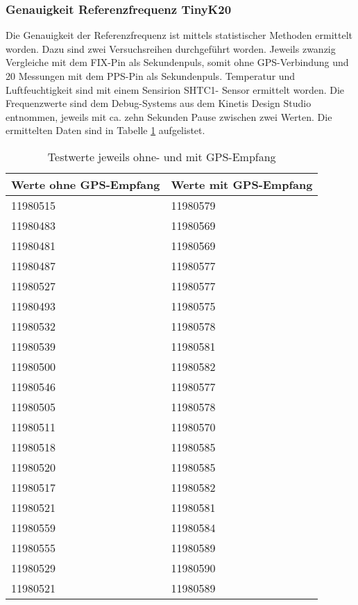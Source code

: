 \subsubsection{Genauigkeit Referenzfrequenz TinyK20}
Die Genauigkeit der Referenzfrequenz ist mittels statistischer Methoden ermittelt worden. Dazu sind zwei Versuchsreihen durchgeführt worden. Jeweils zwanzig Vergleiche mit dem FIX-Pin als Sekundenpuls, somit ohne GPS-Verbindung und 20 Messungen mit dem PPS-Pin als Sekundenpuls. Temperatur und Luftfeuchtigkeit sind mit einem Sensirion SHTC1- Sensor ermittelt worden.
Die Frequenzwerte sind dem Debug-Systems aus dem Kinetis Design Studio entnommen, jeweils mit ca. zehn Sekunden Pause zwischen zwei Werten. Die ermittelten Daten sind in Tabelle \ref{tab:testvalues} aufgelistet.
\begin{table}[H]
	\centering
	\begin{tabular}{|l|l|} \hline
		\textbf{Werte ohne GPS-Empfang}	& \textbf{Werte mit GPS-Empfang} \\ \hline
		11980515						& 11980579 \\ \hline
		11980483						& 11980569 \\ \hline
		11980481						& 11980569 \\ \hline
		11980487						& 11980577 \\ \hline
		11980527						& 11980577 \\ \hline
		11980493						& 11980575 \\ \hline
		11980532						& 11980578 \\ \hline
		11980539						& 11980581 \\ \hline
		11980500						& 11980582 \\ \hline
		11980546						& 11980577 \\ \hline
		11980505						& 11980578 \\ \hline
		11980511						& 11980570 \\ \hline
		11980518						& 11980585 \\ \hline
		11980520						& 11980585 \\ \hline
		11980517						& 11980582 \\ \hline
		11980521						& 11980581 \\ \hline
		11980559						& 11980584 \\ \hline
		11980555						& 11980589 \\ \hline
		11980529						& 11980590 \\ \hline 
		11980521						& 11980589 \\ \hline
	\end{tabular}
	\caption{Testwerte jeweils ohne- und mit GPS-Empfang}
	\label{tab:testvalues}
\end{table}
